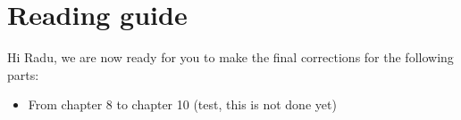 \section{Reading guide}
Hi Radu, we are now ready for you to make the final corrections for the following parts:
\begin{itemize}
\item From chapter 8 to chapter 10 (test, this is not done yet)
\end{itemize}

